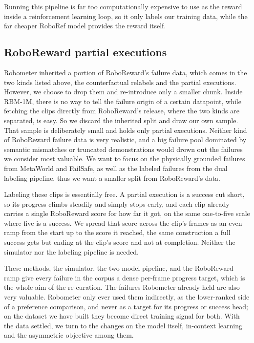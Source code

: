 Running this pipeline is far too computationally expensive to use as the reward inside a reinforcement learning loop, so it only labels our training data, while the far cheaper RoboRef model provides the reward itself.

\subsection{RoboReward partial executions}
\label{sec:method-roboreward}

Robometer inherited a portion of RoboReward's failure data, which comes in the two kinds listed above, the counterfactual relabels and the partial executions. However, we choose to drop them and re-introduce only a smaller chunk. Inside RBM-1M, there is no way to tell the failure origin of a certain datapoint, while fetching the clips directly from RoboReward's release, where the two kinds are separated, is easy. So we discard the inherited split and draw our own sample. That sample is deliberately small and holds only partial executions. Neither kind of RoboReward failure data is very realistic, and a big failure pool dominated by semantic mismatches or truncated demonstrations would drown out the failures we consider most valuable. We want to focus on the physically grounded failures from MetaWorld and FailSafe, as well as the labeled failures from the dual labeling pipeline, thus we want a smaller split from RoboReward's data.

Labeling these clips is essentially free. A partial execution is a success cut short, so its progress climbs steadily and simply stops early, and each clip already carries a single RoboReward score for how far it got, on the same one-to-five scale where five is a success. We spread that score across the clip's frames as an even ramp from the start up to the score it reached, the same construction a full success gets but ending at the clip's score and not at completion. Neither the simulator nor the labeling pipeline is needed.

These methods, the simulator, the two-model pipeline, and the RoboReward ramp give every failure in the corpus a dense per-frame progress target, which is the whole aim of the re-curation. The failures Robometer already held are also very valuable. Robometer only ever used them indirectly, as the lower-ranked side of a preference comparison, and never as a target for its progress or success head; on the dataset we have built they become direct training signal for both. With the data settled, we turn to the changes on the model itself, in-context learning and the asymmetric objective among them.


